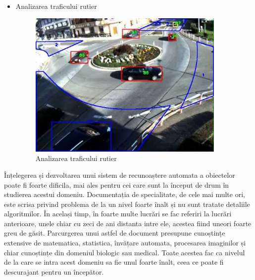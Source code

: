 \begin{itemize}
	\item Analizarea traficului rutier	
	\begin{figure}[H]
		\centering
			\includegraphics[width=0.9\textwidth]{imagini/traffic_analisys.jpg}
		\caption{Analizarea traficului rutier\footnotemark}
		\label{fig:traffic_analisys}
	\end{figure}

\end{itemize}

Înțelegerea și dezvoltarea unui sistem de recunoaștere automata a obiectelor poate fi foarte dificila, mai ales pentru cei care sunt la început de drum în studierea acestui domeniu. 
Documentația de specialitate, de cele mai multe ori, este scrisa privind problema de la un nivel foarte înalt și nu sunt tratate detaliile algoritmilor. 
În același timp, în foarte multe lucrări se fac referiri la lucrări anterioare, unele chiar cu zeci de ani distanta intre ele, acestea fiind uneori foarte greu de găsit.
Parcurgerea unui astfel de document presupune cunoștințe extensive de matematica, statistica, învățare automata, procesarea imaginilor și chiar cunoștințe din domeniul biologic sau medical. 
Toate acestea fac ca nivelul de la care se intra acest domeniu sa fie unul foarte înalt, ceea ce poate fi descurajant pentru un începător.


